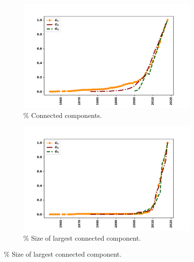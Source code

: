 \documentclass{article}
\theoremstyle{definition}
\begin{document}
\begin{figure}[!hbtp]
     \begin{subfigure}{.45\textwidth}\centering
        \includegraphics[width=1.1\textwidth]{./assets/images/connected_components_over_time.pdf}
        \caption{\% Connected components.}\label{fig:normalised_number_connected_components}
     \end{subfigure}
    \begin{subfigure}{.45\textwidth}\centering
        \includegraphics[width=1.1\textwidth]{./assets/images/size_of_largest_cc_over_time.pdf}
        \caption{\% Size of largest connected component.}\label{fig:normalised_size_of_cc}
    \end{subfigure}


\end{figure}
\end{document}
